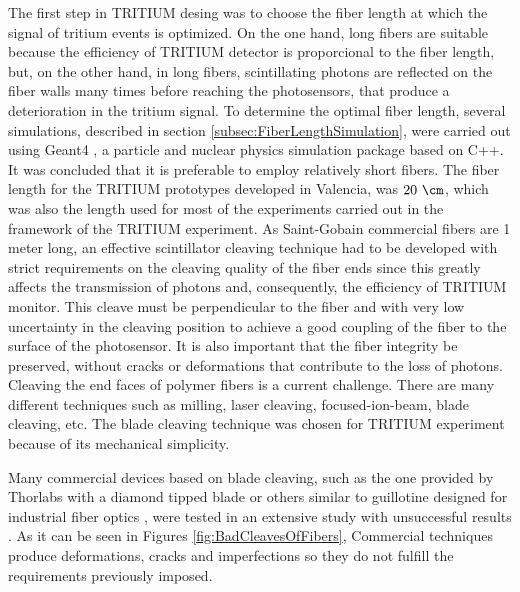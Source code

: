 The first step in TRITIUM desing was to choose the fiber length at which the signal of tritium events is optimized. On the one hand, long fibers are suitable because the efficiency of TRITIUM detector is proporcional to the fiber length, but, on the other hand, in long fibers, scintillating photons are reflected on the fiber walls many times before reaching the photosensors, that produce a deterioration in the tritium signal. To determine the optimal fiber length, several simulations, described in section \ref{subsec:FiberLengthSimulation}, were carried out using Geant4 \cite{Geant4WebPage}, a particle and nuclear physics simulation package based on C++. It was concluded that it is preferable to employ relatively short fibers. The fiber length for the TRITIUM prototypes developed in Valencia, was $20~\cm$, which was also the length used for most of the experiments carried out in the framework of the TRITIUM experiment. As Saint-Gobain commercial fibers are 1 meter long, an effective scintillator cleaving technique had to be developed with strict requirements on the cleaving quality of the fiber ends since this greatly affects the transmission of photons and, consequently, the efficiency of TRITIUM monitor. This cleave must be perpendicular to the fiber and with very low uncertainty in the cleaving position to achieve a good coupling of the fiber to the surface of the photosensor. It is also important that the fiber integrity be preserved, without cracks or deformations that contribute to the loss of photons. Cleaving the end faces of polymer fibers is a current challenge. There are many different techniques such as milling, laser cleaving, focused-ion-beam, blade cleaving, etc. The blade cleaving technique was chosen for TRITIUM experiment because of its mechanical simplicity. %

Many commercial devices based on blade cleaving, such as the one provided by Thorlabs with a diamond tipped blade \cite{DiamondThorlabs} or others similar to guillotine designed for industrial fiber optics \cite{GuillotineIFO}, were tested in an extensive study with unsuccessful results \cite{TFGAlberto}. As it can be seen in Figures \ref{fig:BadCleavesOfFibers}, Commercial techniques produce deformations, cracks and imperfections so they do not fulfill the requirements previously imposed.

